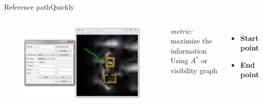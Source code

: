 \begin{frame}{Reference path}{Quickly}

\begin{columns}
\begin{figure}
\centering
\includegraphics[width = \textwidth]{./screenshot/quickly_reference_path.png}
\end{figure}

\begin{minipage}{\textwidth}
\emph{metric:} maximize the information
\bigskip
Using $ A^{*} $ or visibility graph
\begin{itemize}
\item \textbf{Start point}
\item \textbf{End point}
\end{itemize}
\end{minipage}
\end{columns}

\end{frame}


